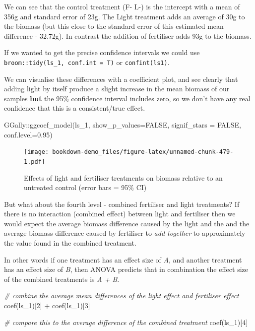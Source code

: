 \documentclass[
]{book}
\newenvironment{Shaded}{\begin{snugshade}}{\end{snugshade}}
\newcommand{\AttributeTok}[1]{\textcolor[rgb]{0.77,0.63,0.00}{#1}}
\newcommand{\CommentTok}[1]{\textcolor[rgb]{0.56,0.35,0.01}{\textit{#1}}}
\newcommand{\ConstantTok}[1]{\textcolor[rgb]{0.00,0.00,0.00}{#1}}
\newcommand{\DecValTok}[1]{\textcolor[rgb]{0.00,0.00,0.81}{#1}}
\newcommand{\FloatTok}[1]{\textcolor[rgb]{0.00,0.00,0.81}{#1}}
\newcommand{\FunctionTok}[1]{\textcolor[rgb]{0.00,0.00,0.00}{#1}}
\newcommand{\NormalTok}[1]{#1}
\newcommand{\SpecialCharTok}[1]{\textcolor[rgb]{0.00,0.00,0.00}{#1}}
\begin{document}
We can see that the control treatment (F- L-) is the intercept with a mean of 356g and standard error of 23g. The Light treatment adds an average of 30g to the biomass (but this close to the standard error of this estimated mean difference - 32.72g). In contrast the addition of fertiliser adds 93g to the biomass.

If we wanted to get the precise confidence intervals we could use \texttt{broom::tidy(ls\_1,\ conf.int\ =\ T)} or \texttt{confint(ls1)}.

We can visualise these differences with a coefficient plot, and see clearly that adding light by itself produce a slight increase in the mean biomass of our samples \textbf{but} the 95\% confidence interval includes zero, so we don't have any real confidence that this is a consistent/true effect.

\begin{Shaded}
\begin{Highlighting}[]
\NormalTok{GGally}\SpecialCharTok{::}\FunctionTok{ggcoef\_model}\NormalTok{(ls\_1,}
                      \AttributeTok{show\_p\_values=}\ConstantTok{FALSE}\NormalTok{,}
                      \AttributeTok{signif\_stars =} \ConstantTok{FALSE}\NormalTok{,}
                     \AttributeTok{conf.level=}\FloatTok{0.95}\NormalTok{)}
\end{Highlighting}
\end{Shaded}

\begin{figure}
\centering
\texttt{[image: bookdown-demo\_files/figure-latex/unnamed-chunk-479-1.pdf]}
\caption{\label{fig:unnamed-chunk-479}Effects of light and fertiliser treatments on biomass relative to an untreated control (error bars = 95\% CI)}
\end{figure}

But what about the fourth level - combined fertiliser and light treatments? If there is no interaction (combined effect) between light and fertiliser then we would expect the average biomass difference caused by the light and the and the average biomass difference caused by fertiliser to \emph{add together} to approximately the value found in the combined treatment.

In other words if one treatment has an effect size of \emph{A}, and another treatment has an effect size of \emph{B}, then ANOVA predicts that in combination the effect size of the combined treatments is \emph{A + B}.

\begin{Shaded}
\begin{Highlighting}[]
\CommentTok{\# combine the average mean differences of the light effect and fertiliser effect}
\FunctionTok{coef}\NormalTok{(ls\_1)[}\DecValTok{2}\NormalTok{] }\SpecialCharTok{+} \FunctionTok{coef}\NormalTok{(ls\_1)[}\DecValTok{3}\NormalTok{] }

\CommentTok{\# compare this to the average difference of the combined treatment}
\FunctionTok{coef}\NormalTok{(ls\_1)[}\DecValTok{4}\NormalTok{]}
\end{Highlighting}
\end{Shaded}
\end{document}
